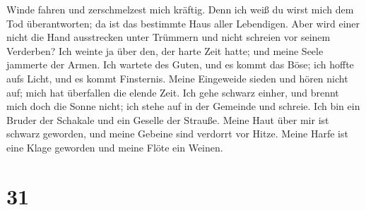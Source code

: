 Winde fahren und zerschmelzest mich kräftig.  Denn ich weiß
du wirst mich dem Tod überantworten; da ist das bestimmte Haus aller
Lebendigen.  Aber wird einer nicht die Hand ausstrecken
unter Trümmern und nicht schreien vor seinem Verderben? 
Ich weinte ja über den, der harte Zeit hatte; und meine Seele jammerte
der Armen.  Ich wartete des Guten, und es kommt das Böse;
ich hoffte aufs Licht, und es kommt Finsternis.  Meine
Eingeweide sieden und hören nicht auf; mich hat überfallen die elende
Zeit.  Ich gehe schwarz einher, und brennt mich doch die
Sonne nicht; ich stehe auf in der Gemeinde und schreie. 
Ich bin ein Bruder der Schakale und ein Geselle der Strauße.
 Meine Haut über mir ist schwarz geworden, und meine
Gebeine sind verdorrt vor Hitze.  Meine Harfe ist eine
Klage geworden und meine Flöte ein Weinen.

\hypertarget{section-30}{%
\section{31}\label{section-30}}

